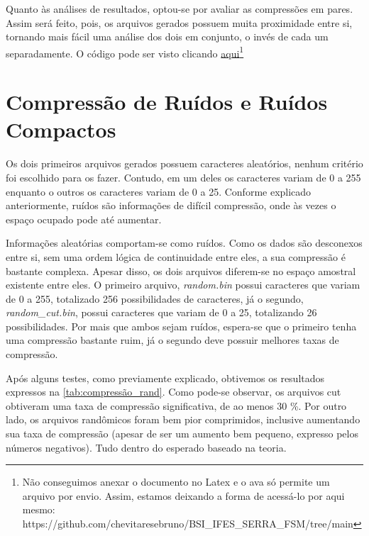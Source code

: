 \hspace{1.5 cm} Quanto às análises de resultados, optou-se por avaliar as compressões em pares. Assim será feito, pois, os arquivos gerados possuem muita proximidade entre si, tornando mais fácil uma análise dos dois em conjunto, o invés de cada um separadamente. O código pode ser visto clicando \href{https://github.com/chevitaresebruno/BSI_IFES_SERRA_FSM/tree/main}{aqui}\footnote{Não conseguimos anexar o documento no Latex e o ava só permite um arquivo por envio. Assim, estamos deixando a forma de acessá-lo por aqui mesmo: https://github.com/chevitaresebruno/BSI_IFES_SERRA_FSM/tree/main}


\section{Compressão de Ruídos e Ruídos Compactos}
Os dois primeiros arquivos gerados possuem caracteres aleatórios, nenhum critério foi escolhido para os fazer. Contudo, em um deles os caracteres variam de 0 a 255 enquanto o outros os caracteres variam de 0 a 25. Conforme explicado anteriormente, ruídos são informações de difícil compressão, onde às vezes o espaço ocupado pode até aumentar.

\hspace{1.5 cm} Informações aleatórias comportam-se como ruídos. Como os dados são desconexos entre si, sem uma ordem lógica de continuidade entre eles, a sua compressão é bastante complexa. Apesar disso, os dois arquivos diferem-se no espaço amostral existente entre eles. O primeiro arquivo, \textit{random.bin} possui caracteres que variam de 0 a 255, totalizado 256 possibilidades de caracteres, já o segundo, \textit{random_cut.bin}, possui caracteres que variam de 0 a 25, totalizando 26 possibilidades. Por mais que ambos sejam ruídos, espera-se que o primeiro tenha uma compressão bastante ruim, já o segundo deve possuir melhores taxas de compressão.

\hspace{1.5 cm} Após alguns testes, como previamente explicado, obtivemos os resultados expressos na \ref{tab:compressão_rand}. Como pode-se observar, os arquivos cut obtiveram uma taxa de compressão significativa, de ao menos 30 \%. Por outro lado, os arquivos randômicos foram bem pior comprimidos, inclusive aumentando sua taxa de compressão (apesar de ser um aumento bem pequeno, expresso pelos números negativos). Tudo dentro do esperado baseado na teoria.

